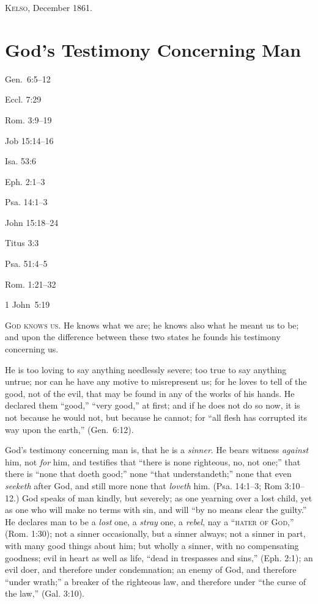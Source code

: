 \documentclass[
]{book}
\begin{document}
\textsc{Kelso}, December 1861.

\hypertarget{gods-testimony-concerning-man}{%
\chapter{God's Testimony Concerning Man}\label{gods-testimony-concerning-man}}

Gen.~6:5--12

Eccl. 7:29

Rom. 3:9--19

Job 15:14--16

Isa. 53:6

Eph. 2:1--3

Psa. 14:1--3

John 15:18--24

Titus 3:3

Psa. 51:4--5

Rom. 1:21--32

1 John~5:19

\textsc{God knows us}. He knows what we are; he knows also what he meant us to be; and upon the difference between these two states he founds his testimony concerning us.

He is too loving to say anything needlessly severe; too true to say anything untrue; nor can he have any motive to misrepresent us; for he loves to tell of the good, not of the evil, that may be found in any of the works of his hands. He declared them ``good,'' ``very good,'' at first; and if he does not do so now, it is not because he would not, but because he cannot; for ``all flesh has corrupted its way upon the earth,'' (Gen.~6:12).

God's testimony concerning man is, that he is a \emph{sinner}. He bears witness \emph{against} him, not \emph{for} him, and testifies that ``there is none righteous, no, not one;'' that there is ``none that doeth good;'' none ``that understandeth;'' none that even \emph{seeketh} after God, and still more none that \emph{loveth} him. (Psa. 14:1--3; Rom 3:10--12.) God speaks of man kindly, but severely; as one yearning over a lost child, yet as one who will make no terms with sin, and will ``by no means clear the guilty.'' He declares man to be a \emph{lost} one, a \emph{stray} one, a \emph{rebel}, nay a ``\textsc{hater of God},'' (Rom. 1:30); not a sinner occasionally, but a sinner always; not a sinner in part, with many good things about him; but wholly a sinner, with no compensating goodness; evil in heart as well as life, ``dead in trespasses and sins,'' (Eph. 2:1); an evil doer, and therefore under condemnation; an enemy of God, and therefore ``under wrath;'' a breaker of the righteous law, and therefore under ``the curse of the law,'' (Gal. 3:10).
\end{document}
